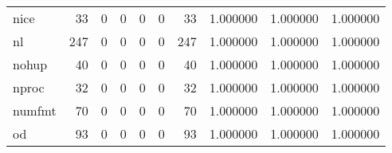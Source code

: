 \begin{longtable}{lrrrrrrrrr}
nice      &                                        33 &                                                  0 &                                                  0 &                                                  0 &                                                  0 &                                                 33 &                                           1.000000 &                               1.000000 &                             1.000000 \\
nl        &                                       247 &                                                  0 &                                                  0 &                                                  0 &                                                  0 &                                                247 &                                           1.000000 &                               1.000000 &                             1.000000 \\
nohup     &                                        40 &                                                  0 &                                                  0 &                                                  0 &                                                  0 &                                                 40 &                                           1.000000 &                               1.000000 &                             1.000000 \\
nproc     &                                        32 &                                                  0 &                                                  0 &                                                  0 &                                                  0 &                                                 32 &                                           1.000000 &                               1.000000 &                             1.000000 \\
numfmt    &                                        70 &                                                  0 &                                                  0 &                                                  0 &                                                  0 &                                                 70 &                                           1.000000 &                               1.000000 &                             1.000000 \\
od        &                                        93 &                                                  0 &                                                  0 &                                                  0 &                                                  0 &                                                 93 &                                           1.000000 &                               1.000000 &                             1.000000 \\

\end{longtable}
